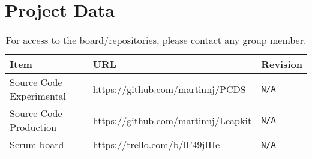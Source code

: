 \section{Project Data}

\begin{table}[h!]
    \begin{tabular}{l|l|l}
        \textbf{Item}            & \textbf{URL}                              & \textbf{Revision}\\\hline
        Source Code Experimental & \url{https://github.com/martinnj/PCDS}    & \texttt{N/A}\\
        Source Code Production   & \url{https://github.com/martinnj/Leapkit} & \texttt{N/A}\\
        Scrum board              & \url{https://trello.com/b/lF49jIHe}       & \texttt{N/A}
    \end{tabular}
    \label{tab:projdata}
    \caption{For access to the board/repositories, please contact any group member.}
\end{table}




